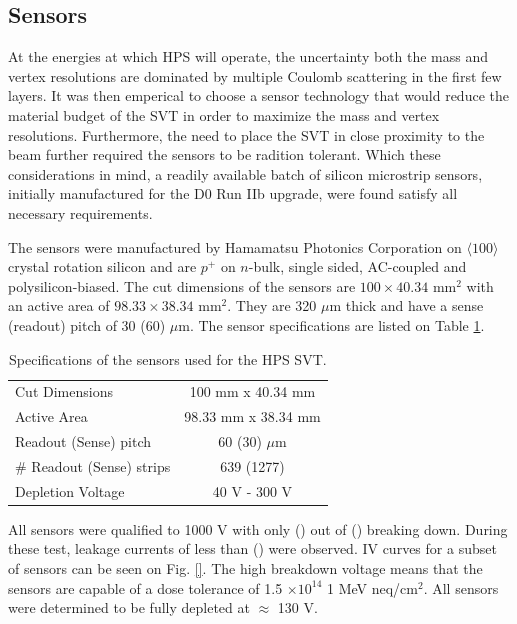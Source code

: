 \subsection*{Sensors}

At the energies at which HPS will operate, the uncertainty both the mass and
vertex resolutions are dominated by multiple Coulomb scattering in the first 
few layers.  It was then emperical to choose a sensor technology that would 
reduce the material budget of the SVT in order to maximize the mass and vertex
resolutions.  Furthermore, the need to place the SVT in close proximity to the 
beam further required the sensors to be radition tolerant.  Which these 
considerations in mind, a readily available batch of silicon microstrip sensors,
initially manufactured for the D0 Run IIb upgrade, were found satisfy all 
necessary requirements.

The sensors were manufactured by Hamamatsu Photonics Corporation on 
$\langle 100 \rangle$ crystal rotation silicon and are $p^{+}$ on $n$-bulk, 
single sided, AC-coupled and polysilicon-biased. The cut dimensions of the 
sensors are $100 \times 40.34$ mm$^{2}$ with an active area of 
$98.33 \times 38.34$ mm$^{2}$.  They are 320 $\mu$m thick and have a sense
(readout) pitch of 30 (60) $\mu$m. The sensor specifications are listed on 
Table \ref{tab:sensor_specs}.
\begin{table}[t]
    \centering
    \begin{tabular}{l|c}
        \hline
        Cut Dimensions & 100 mm x 40.34 mm \\
        Active Area & 98.33 mm x 38.34 mm \\
        Readout (Sense) pitch & 60 (30) $\mu$m \\
        \# Readout (Sense) strips & 639 (1277) \\
        Depletion Voltage & 40 V - 300 V \\
        \hline
    \end{tabular}
    \caption{Specifications of the sensors used for the HPS SVT.}
    \label{tab:sensor_specs}
\end{table}

All sensors were qualified to 1000 V with only () out of () breaking down.  
During these test, leakage currents of less than () were observed. IV curves
for a subset of sensors can be seen on Fig. \ref{}.  The high breakdown voltage
means that the sensors are capable of a dose tolerance of  1.5 
$\times 10^{14}$ 1 MeV neq/cm$^{2}$.  All sensors were determined to be fully 
depleted at $\approx$ 130 V. 

